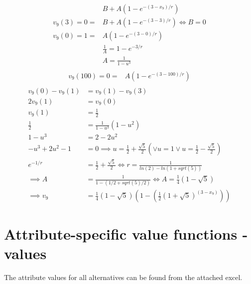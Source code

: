 \documentclass{article}
\begin{document}
\begin{align}
&B+A(1-e^{-(3-x_9)/r})\\ 
v_9(3) = 0 =& B+A(1-e^{-(3-3)/r}) \iff B= 0 \\
v_9(0) = 1 =& A(1-e^{-(3-0)/r}) \\
& \frac{1}{A}= 1 - e^{-3/r} \\
& A= \frac{1}{1-u^3} \\
\end{align}
\begin{align}
v_9(100)= 0 =& A(1-e^{-(3-100)/r})\\
\end{align}
\begin{align}
v_9(0)-v_9(1) &= v_9(1) - v_9(3)\\
2v_9(1) &= v_9(0)\\
v_9(1) &= \frac{1}{2}\\
\frac{1}{2} &= \frac{1}{1-u^3}(1-u^{2})\\
1-u^3 &= 2-2u^2\\
-u^3 + 2u^2 - 1 &= 0 \implies  u=\frac{1}{2}+\frac{\sqrt{5}}{2} \left(\lor u=1 \lor u=\frac{1}{2}-\frac{\sqrt{5}}{2}\right) \\
e^{-1/r} &= 	\frac{1}{2}+\frac{\sqrt{5}}{2} \iff r = \frac{1}{ln(2) - ln(1 + sqrt(5))}	\\
\implies A&= \frac{1}{1-( 1/2 + sqrt(5)/2)} \iff A= \frac{1}{4}(1-\sqrt{5}) \\
\implies v_9&= \frac{1}{4}(1-\sqrt{5})\left(1-\left(\frac{1}{2}\left(1+\sqrt{5}\right)^{(3-x_9)}\right)\right)
\end{align}
\section{Attribute-specific value functions - values}
		The attribute values for all alternatives can be found from the attached excel.
\end{document}
